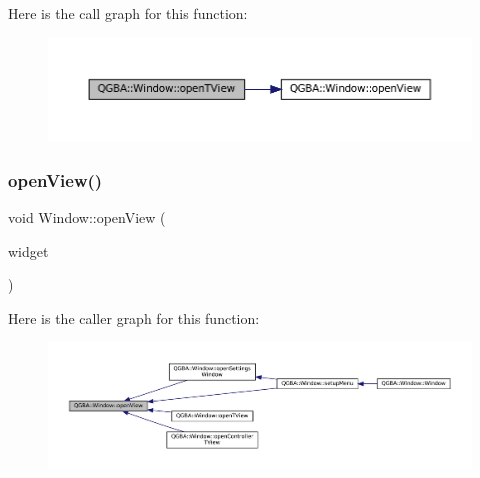 Here is the call graph for this function\+:
\nopagebreak
\begin{figure}[H]
\begin{center}
\leavevmode
\includegraphics[width=350pt]{class_q_g_b_a_1_1_window_ab4bbc62ad6d07c39fab46adbc81086e5_cgraph}
\end{center}
\end{figure}
\mbox{\label{class_q_g_b_a_1_1_window_a0543c9726f3fd0a9d312aef0c741e296}} 
\subsubsection{\texorpdfstring{open\+View()}{openView()}}
{\footnotesize\ttfamily void Window\+::open\+View (\begin{DoxyParamCaption}\item[{Q\+Widget $\ast$}]{widget }\end{DoxyParamCaption})\hspace{0.3cm}{\ttfamily [private]}}

Here is the caller graph for this function\+:
\nopagebreak
\begin{figure}[H]
\begin{center}
\leavevmode
\includegraphics[width=350pt]{class_q_g_b_a_1_1_window_a0543c9726f3fd0a9d312aef0c741e296_icgraph}
\end{center}
\end{figure}
\mbox{\label{class_q_g_b_a_1_1_window_a8fb7379452f61684d4554b4b2d7911b8}} 
